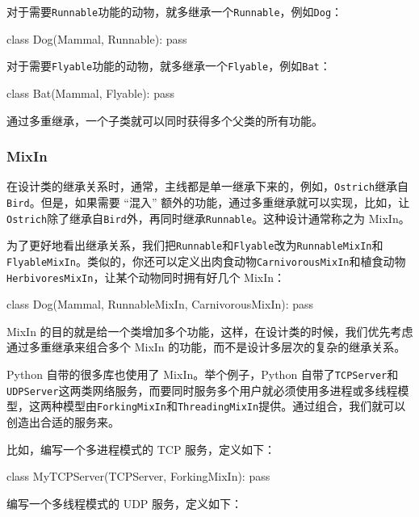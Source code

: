 对于需要\texttt{Runnable}功能的动物，就多继承一个\texttt{Runnable}，例如\texttt{Dog}：

\begin{pythoncode}
class Dog(Mammal, Runnable):
    pass
\end{pythoncode}

对于需要\texttt{Flyable}功能的动物，就多继承一个\texttt{Flyable}，例如\texttt{Bat}：

\begin{pythoncode}
class Bat(Mammal, Flyable):
    pass
\end{pythoncode}

通过多重继承，一个子类就可以同时获得多个父类的所有功能。

\hypertarget{mixin}{%
\subsubsection{MixIn}\label{mixin}}

在设计类的继承关系时，通常，主线都是单一继承下来的，例如，\texttt{Ostrich}继承自\texttt{Bird}。但是，如果需要
``混入''
额外的功能，通过多重继承就可以实现，比如，让\texttt{Ostrich}除了继承自\texttt{Bird}外，再同时继承\texttt{Runnable}。这种设计通常称之为
MixIn。

为了更好地看出继承关系，我们把\texttt{Runnable}和\texttt{Flyable}改为\texttt{RunnableMixIn}和\texttt{FlyableMixIn}。类似的，你还可以定义出肉食动物\texttt{CarnivorousMixIn}和植食动物\texttt{HerbivoresMixIn}，让某个动物同时拥有好几个
MixIn：

\begin{pythoncode}
class Dog(Mammal, RunnableMixIn, CarnivorousMixIn):
    pass
\end{pythoncode}

MixIn
的目的就是给一个类增加多个功能，这样，在设计类的时候，我们优先考虑通过多重继承来组合多个
MixIn 的功能，而不是设计多层次的复杂的继承关系。

Python 自带的很多库也使用了 MixIn。举个例子，Python
自带了\texttt{TCPServer}和\texttt{UDPServer}这两类网络服务，而要同时服务多个用户就必须使用多进程或多线程模型，这两种模型由\texttt{ForkingMixIn}和\texttt{ThreadingMixIn}提供。通过组合，我们就可以创造出合适的服务来。

比如，编写一个多进程模式的 TCP 服务，定义如下：

\begin{pythoncode}
class MyTCPServer(TCPServer, ForkingMixIn):
    pass
\end{pythoncode}

编写一个多线程模式的 UDP 服务，定义如下：

